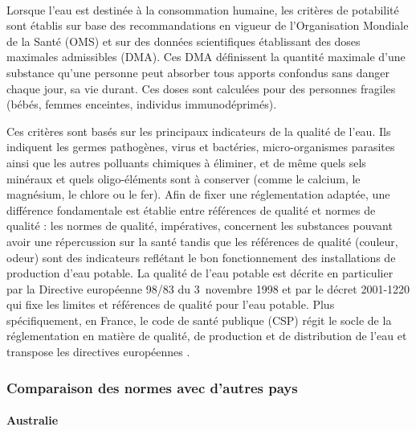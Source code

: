 \documentclass{article}
\begin{document}
\paragraph{} Lorsque l’eau est destinée à la consommation humaine, les critères de potabilité sont établis sur base des recommandations en vigueur de l’Organisation Mondiale de la Santé (OMS) et sur des données scientifiques établissant des doses maximales admissibles (DMA). Ces DMA définissent la quantité maximale d’une substance qu’une personne peut absorber tous apports confondus sans danger chaque jour, sa vie durant. Ces doses sont calculées pour des personnes fragiles (bébés, femmes enceintes, individus immunodéprimés).

Ces critères sont basés sur les principaux indicateurs de la qualité de l’eau. Ils indiquent les germes pathogènes, virus et bactéries, micro-organismes parasites ainsi que les autres polluants chimiques à éliminer, et de même quels sels minéraux et quels oligo-éléments sont à conserver (comme le calcium, le magnésium, le chlore ou le fer). Afin de fixer une réglementation adaptée, une différence fondamentale est établie entre références de qualité et normes de qualité : les normes de qualité, impératives, concernent les substances pouvant avoir une répercussion sur la santé tandis que les références de qualité (couleur, odeur) sont des indicateurs reflétant le bon fonctionnement des installations de production d’eau potable.
La qualité de l’eau potable est décrite en particulier par la Directive européenne 98/83 du 3~novembre 1998 et par le décret 2001-1220 qui fixe les limites et références de qualité pour l’eau potable. Plus spécifiquement, en France, le code de santé publique (CSP) régit le socle de la réglementation en matière de qualité, de production et de distribution de l’eau et transpose les directives européennes \cite{noauthor_quelles_nodate}.

\subsubsection{Comparaison des normes avec d’autres pays}

\paragraph{Australie \\ \\}
\end{document}
